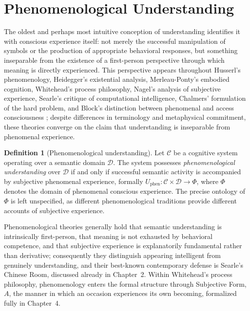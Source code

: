 \documentclass[11pt,twoside,openright]{book}
\numberwithin{equation}{chapter}
\theoremstyle{definition}
\newtheorem{definition}{Definition}[chapter]
\theoremstyle{plain}
\theoremstyle{remark}
\theoremstyle{definition}
\newcommand{\Domain}{\mathcal{D}}
\newcommand{\System}{\mathcal{C}}
\newcommand{\WSubjForm}{A}
\begin{document}
\section{Phenomenological Understanding}

The oldest and perhaps most intuitive conception of understanding
identifies it with conscious experience itself: not merely the successful
manipulation of symbols or the production of appropriate behavioral
responses, but something inseparable from the existence of a first-person
perspective through which meaning is directly experienced. This
perspective appears throughout Husserl's phenomenology, Heidegger's
existential analysis, Merleau-Ponty's embodied cognition, Whitehead's
process philosophy, Nagel's analysis of subjective experience, Searle's
critique of computational intelligence, Chalmers' formulation of the hard
problem, and Block's distinction between phenomenal and access
consciousness \cite{Husserl1913,Heidegger1927,MerleauPonty1945,
Whitehead1929,Nagel1974,Searle1980,Chalmers1996,Block1995}; despite
differences in terminology and metaphysical commitment, these theories
converge on the claim that understanding is inseparable from phenomenal
experience.

\begin{definition}[Phenomenological understanding]
Let $\System$ be a cognitive system operating over a semantic domain
$\Domain$. The system possesses \emph{phenomenological understanding}
over $\Domain$ if and only if successful semantic activity is
accompanied by subjective phenomenal experience, formally
$U_{\mathrm{phen}}:\System\times\Domain\to\Phi$, where $\Phi$ denotes the
domain of phenomenal conscious experience. The precise ontology of $\Phi$
is left unspecified, as different phenomenological traditions provide
different accounts of subjective experience.
\end{definition}

Phenomenological theories generally hold that semantic understanding is
intrinsically first-person, that meaning is not exhausted by behavioral
competence, and that subjective experience is explanatorily fundamental
rather than derivative; consequently they distinguish appearing
intelligent from genuinely understanding, and their best-known
contemporary defense is Searle's Chinese Room, discussed already in
Chapter~2. Within Whitehead's process philosophy, phenomenology enters the
formal structure through Subjective Form, $\WSubjForm$, the manner in
which an occasion experiences its own becoming, formalized fully in
Chapter~4.
\end{document}
